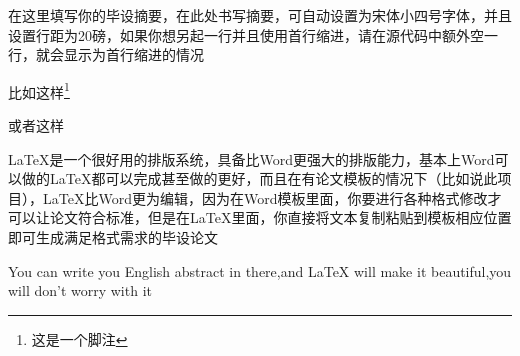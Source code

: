 \documentclass{NCEPUthesis}
\begin{document}


\distanceLogoTitle{2cm}%







\NCEPUcover%
\newpage
\NCEPUabstract

\begin{NCEPUabstracttext}
	在这里填写你的毕设摘要，在此处书写摘要，可自动设置为宋体小四号字体，并且设置行距为20磅，如果你想另起一行并且使用首行缩进，请在源代码中额外空一行，就会显示为首行缩进的情况

	比如这样\footnote{这是一个脚注}

    或者这样

    \LaTeX{}是一个很好用的排版系统，具备比Word更强大的排版能力，基本上Word可以做的\LaTeX{}都可以完成甚至做的更好，而且在有论文模板的情况下（比如说此项目），\LaTeX{}比Word更为编辑，因为在Word模板里面，你要进行各种格式修改才可以让论文符合标准，但是在\LaTeX{}里面，你直接将文本复制粘贴到模板相应位置即可生成满足格式需求的毕设论文
\end{NCEPUabstracttext}

\begin{NCEPUenabstract}%

You can write you English abstract in there,and LaTeX will make it beautiful,you will don't worry with it
\end{NCEPUenabstract}
\tableofcontents%
\newpage
{}%
\newpage%
\end{document}
